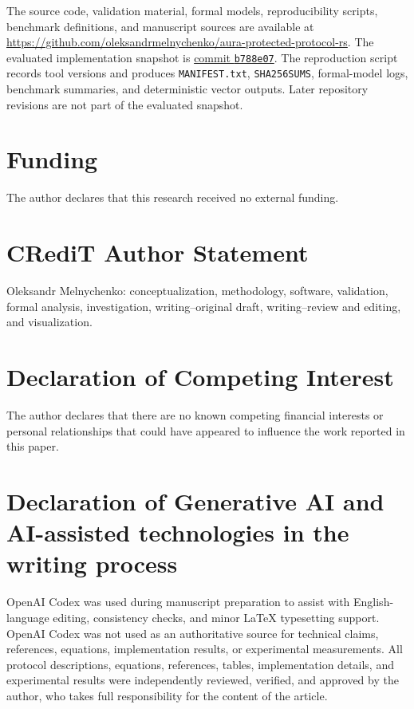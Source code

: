 \documentclass[preprint,12pt]{elsarticle}
\theoremstyle{definition}
\begin{document}
The source code, validation material, formal models, reproducibility scripts,
benchmark definitions, and manuscript sources are available at
\url{https://github.com/oleksandrmelnychenko/aura-protected-protocol-rs}.
The evaluated implementation snapshot is
\href{https://github.com/oleksandrmelnychenko/aura-protected-protocol-rs/tree/b788e075b6f3558ce1c3bbdb66d724bb65960f8c}{commit \texttt{b788e07}}.
The reproduction script records tool versions and produces
\texttt{MANIFEST.txt}, \texttt{SHA256SUMS}, formal-model logs, benchmark
summaries, and deterministic vector outputs. Later repository revisions are not
part of the evaluated snapshot.

\section*{Funding}

The author declares that this research received no external funding.

\section*{CRediT Author Statement}

Oleksandr Melnychenko: conceptualization, methodology, software,
validation, formal analysis, investigation, writing--original draft,
writing--review and editing, and visualization.

\section*{Declaration of Competing Interest}

The author declares that there are no known competing financial
interests or personal relationships that could have appeared to
influence the work reported in this paper.

\section*{Declaration of Generative AI and AI-assisted technologies in the writing process}

OpenAI Codex was used during manuscript preparation to assist with
English-language editing, consistency checks, and minor \LaTeX{}
typesetting support. OpenAI Codex was not used as an authoritative
source for technical claims, references, equations, implementation
results, or experimental measurements. All protocol descriptions,
equations, references, tables, implementation details, and experimental
results were independently reviewed, verified, and approved by the
author, who takes full responsibility for the content of the article.
\end{document}
